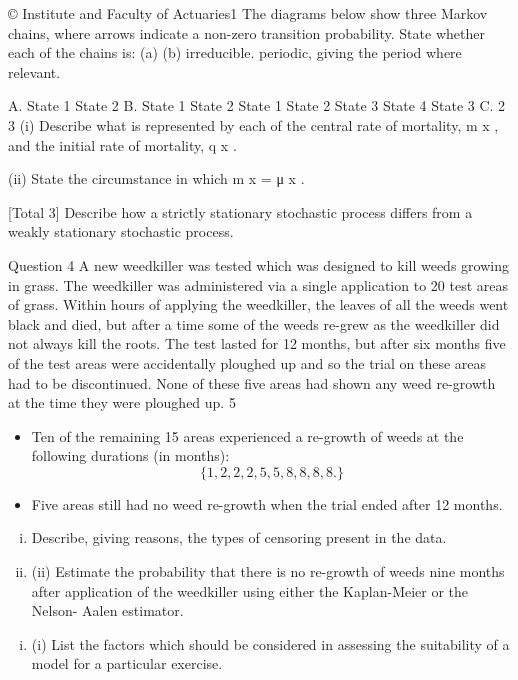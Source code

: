 \documentclass[a4paper,12pt]{article}
\begin{document}
\begin{enumerate}
© Institute and Faculty of Actuaries1
The diagrams below show three Markov chains, where arrows indicate a non-zero
transition probability.
State whether each of the chains is:
(a)
(b)
irreducible.
periodic, giving the period where relevant.

A.
State 1
State 2
B.
State 1 State 2
State 1 State 2
State 3 State 4
State 3
C.
2
3
(i) Describe what is represented by each of the central rate of mortality, m x , and
the initial rate of mortality, q x .

(ii) State the circumstance in which m x = μ x .

[Total 3]
Describe how a strictly stationary stochastic process differs from a weakly stationary
stochastic process.

Question 4
A new weedkiller was tested which was designed to kill weeds growing in grass. The
weedkiller was administered via a single application to 20 test areas of grass. Within
hours of applying the weedkiller, the leaves of all the weeds went black and died, but
after a time some of the weeds re-grew as the weedkiller did not always kill the roots.
The test lasted for 12 months, but after six months five of the test areas were
accidentally ploughed up and so the trial on these areas had to be discontinued. None
of these five areas had shown any weed re-growth at the time they were ploughed up.
5
\begin{itemize}
\item Ten of the remaining 15 areas experienced a re-growth of weeds at the following
durations (in months): \[\{1, 2, 2, 2, 5, 5, 8, 8, 8, 8.\}\]
\item  Five areas still had no weed re-growth when the trial ended after 12 months.
\end{itemize}
\begin{enumerate}[(i)]
\item Describe, giving reasons, the types of censoring present in the data.
\item (ii) Estimate the probability that there is no re-growth of weeds nine months after application of the weedkiller using either the Kaplan-Meier or the Nelson-
Aalen estimator.
\end{enumerate}
\begin{enumerate}[(i)]
\item (i) List the factors which should be considered in assessing the suitability of a
model for a particular exercise.


\end{enumerate}
\end{enumerate}
\end{document}
